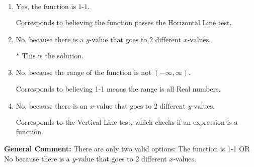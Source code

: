 \documentclass{extbook}[14pt]
\begin{document}
\begin{enumerate}
{\begin{enumerate}[label=\Alph*.]
Corresponds to believing 1-1 means the domain is all Real numbers.
\item \( \text{Yes, the function is 1-1.} \)

Corresponds to believing the function passes the Horizontal Line test.
\item \( \text{No, because there is a $y$-value that goes to 2 different $x$-values.} \)

* This is the solution.
\item \( \text{No, because the range of the function is not $(-\infty, \infty)$.} \)

Corresponds to believing 1-1 means the range is all Real numbers.
\item \( \text{No, because there is an $x$-value that goes to 2 different $y$-values.} \)

Corresponds to the Vertical Line test, which checks if an expression is a function.
\end{enumerate}

\textbf{General Comment:} There are only two valid options: The function is 1-1 OR No because there is a $y$-value that goes to 2 different $x$-values.
}
\end{enumerate}
\end{document}
